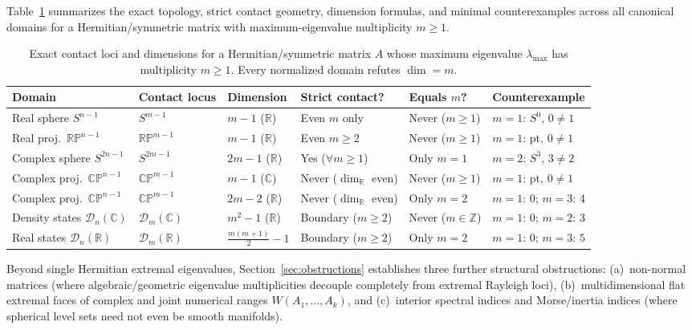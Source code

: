 \documentclass[11pt,a4paper]{article}
\theoremstyle{definition}
\theoremstyle{remark}
\newcommand{\RR}{\mathbb{R}}
\newcommand{\CC}{\mathbb{C}}
\newcommand{\ZZ}{\mathbb{Z}}
\newcommand{\RP}{\mathbb{RP}}
\newcommand{\CP}{\mathbb{CP}}
\newcommand{\cD}{\mathcal{D}}
\begin{document}
Table~\ref{tab:summary} summarizes the exact topology, strict contact geometry, dimension formulas, and minimal counterexamples across all canonical domains for a Hermitian/symmetric matrix with maximum-eigenvalue multiplicity $m \ge 1$.

\begin{table}[ht!]
\centering
\footnotesize
\setlength{\tabcolsep}{3pt}
\renewcommand{\arraystretch}{1.28}
\begin{tabular}{@{}llllll@{}}
\hline
\textbf{Domain} & \textbf{Contact locus} & \textbf{Dimension} & \textbf{Strict contact?} & \textbf{Equals $m$?} & \textbf{Counterexample} \\
\hline
Real sphere $S^{n-1}$ & $S^{m-1}$ & $m - 1$ ($\RR$) & Even $m$ only & Never ($m \ge 1$) & $m=1$: $S^0$, $0 \neq 1$ \\
Real proj.\ $\RP^{n-1}$ & $\RP^{m-1}$ & $m - 1$ ($\RR$) & Even $m \ge 2$ & Never ($m \ge 1$) & $m=1$: pt, $0 \neq 1$ \\
Complex sphere $S^{2n-1}$ & $S^{2m-1}$ & $2m - 1$ ($\RR$) & Yes ($\forall m \ge 1$) & Only $m = 1$ & $m=2$: $S^3$, $3 \neq 2$ \\
Complex proj.\ $\CP^{n-1}$ & $\CP^{m-1}$ & $m - 1$ ($\CC$) & Never ($\dim_{\RR}$ even) & Never ($m \ge 1$) & $m=1$: pt, $0 \neq 1$ \\
Complex proj.\ $\CP^{n-1}$ & $\CP^{m-1}$ & $2m - 2$ ($\RR$) & Never ($\dim_{\RR}$ even) & Only $m = 2$ & $m=1$: $0$; $m=3$: $4$ \\
Density states $\cD_n(\CC)$ & $\cD_m(\CC)$ & $m^2 - 1$ ($\RR$) & Boundary ($m \ge 2$) & Never ($m \in \ZZ$) & $m=1$: $0$; $m=2$: $3$ \\
Real states $\cD_n(\RR)$ & $\cD_m(\RR)$ & $\frac{m(m+1)}{2} - 1$ & Boundary ($m \ge 2$) & Only $m = 2$ & $m=1$: $0$; $m=3$: $5$ \\
\hline
\end{tabular}
\caption{Exact contact loci and dimensions for a Hermitian/symmetric matrix $A$ whose maximum eigenvalue $\lambda_{\max}$ has multiplicity $m \ge 1$. Every normalized domain refutes $\dim = m$.}
\label{tab:summary}
\end{table}

Beyond single Hermitian extremal eigenvalues, Section~\ref{sec:obstructions} establishes three further structural obstructions: (a)~non-normal matrices (where algebraic/geometric eigenvalue multiplicities decouple completely from extremal Rayleigh loci), (b)~multidimensional flat extremal faces of complex and joint numerical ranges $W(A_1, \dots, A_k)$, and (c)~interior spectral indices and Morse/inertia indices (where spherical level sets need not even be smooth manifolds).
\end{document}
